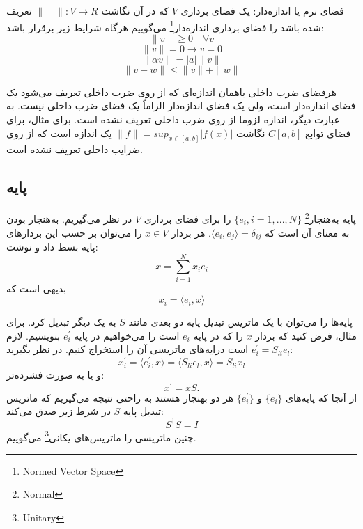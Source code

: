 \begin{definition}{فضای نرم یا اندازه‌دار: }
یک فضای برداری $V$ که در آن نگاشت $\| \quad \| : V \rightarrow R$ تعریف شده باشد را فضای برداری اندازه‌دار\footnote{Normed Vector Space} می‌گوییم هرگاه شرایط زیر برقرار باشد:
\begin{equation}
	\| v \| \geq 0 \quad \forall v
\end{equation}
\begin{equation}
	\| v \| = 0 \rightarrow v = 0
\end{equation}
\begin{equation}
	\| \alpha v \| = |a| \|v \|
\end{equation}
\begin{equation}
\| v + w \| \leq \| v \| + \| w \|
\end{equation}
\end{definition}
هرفضای ضرب داخلی باهمان اندازه‌ای که از روی ضرب داخلی تعریف می‌شود یک فضای اندازه‌دار است، ولی یک فضای اندازه‌دار الزاماً یک فضای ضرب داخلی نیست. به عبارت دیگر، اندازه لزوما از روی ضرب داخلی تعریف نشده است. برای مثال، برای فضای توابع $C[a,b]$ نگاشت $\| f \| = sup_{x \in [a,b]} | f(x)|$ یک اندازه است که از روی ضرایب داخلی تعریف نشده‌ است. 

\subsection{پایه}
پایه به‌هنجار\footnote{Normal} $\{ e_{i}, i = 1,...,N\}$ را برای فضای برداری $V$ در نظر می‌گیریم. به‌هنجار بودن به معنای آن است که $\langle e_{i},e_{j} \rangle = \delta_{ij}$. هر بردار $x \in V$  را می‌توان بر حسب این بردار‌های پایه بسط داد و نوشت:
\begin{equation}
	x = \sum_{i = 1} ^{N} x_{i}e_{i}
\end{equation}
بدیهی است که 
\begin{equation}
	x_{i} = \langle e_{i},x \rangle
\end{equation}


پایه‌ها را می‌توان با یک ماتریس تبدیل پایه دو بعدی مانند $S$ به یک دیگر تبدیل کرد. برای مثال، فرض کنید که بردار $x$ را که در پایه $e_{i}$ است را می‌خواهیم در پایه $e^{'}_{i}$ بنویسیم. لازم است درایه‌های ماتریسی آن را استخراج کنیم. در نظر بگیرید $e^{'}_{i} = S_{li}e_{l}$:
\begin{equation}
x^{'}_{i} = \langle e^{'}_{i},x \rangle = \langle S_{li}e_{l}, x \rangle = S_{li}x_{l}
\end{equation}
و یا به صورت فشرده‌تر:
\begin{equation}
	x^{'} = xS.
\end{equation}
از آنجا که پایه‌های $\{e_{i}\}$ و $\{e^{'}_{i}\}$ هر دو بهنجار هستند به راحتی نتیجه می‌گیریم که ماتریس تبدیل پایه $S$ در شرط زیر صدق می‌کند:
\begin{equation}
S^{\dagger}S = I
\end{equation}
چنین ماتریسی را ماتریس‌های یکانی\footnote{Unitary} می‌گوییم.

